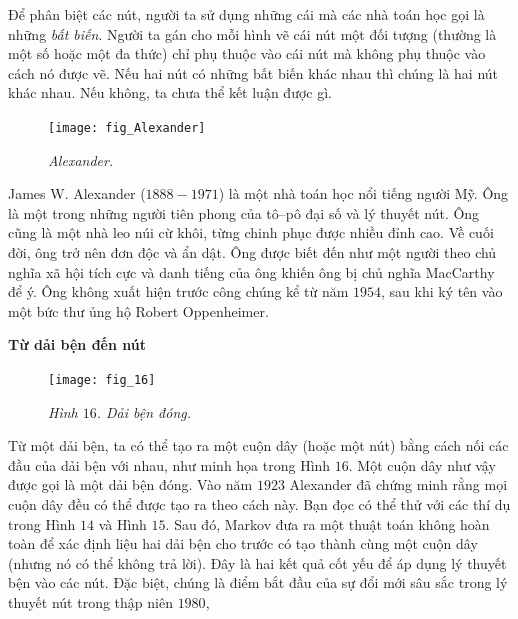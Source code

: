 \begin{multicols}{2}
	\vskip 0.05cm
	Để phân biệt các nút, người ta sử dụng những cái mà các nhà toán học gọi là những \textit{bất biến}. Người ta gán cho mỗi hình vẽ cái nút một đối tượng (thường là một số hoặc một đa thức) chỉ phụ thuộc vào cái nút mà không phụ thuộc vào cách nó được vẽ. Nếu hai nút có những bất biến khác nhau thì chúng là hai nút khác nhau. Nếu không, ta chưa thể kết luận được gì.
	\begin{tBox}
				\begin{figure}
							\vspace*{-15pt}
							\centering
							\captionsetup{labelformat= empty, justification=centering}
							\hspace*{2pt}\texttt{[image: fig\_Alexander]}
							\caption{\small\textit{\color{duongvaotoanhoc}Alexander.}}
							\vspace*{-10pt}
						\end{figure}
				James W. Alexander ($1888-1971$) là một nhà toán học nổi tiếng người Mỹ.  Ông là một trong những người tiên phong của tô--pô đại số và lý thuyết nút. 
				Ông cũng là một nhà leo núi cừ khôi,
từng chinh phục được nhiều đỉnh cao. 
				Về cuối đời, ông trở nên đơn độc và ẩn dật. Ông được biết đến như một người theo chủ nghĩa xã hội tích cực và danh tiếng của ông khiến ông bị chủ nghĩa MacCarthy để ý. Ông không xuất hiện trước công chúng kể từ năm $1954$, sau khi ký tên vào một bức thư ủng hộ Robert Oppenheimer.
			\end{tBox}
	\textbf{\color{duongvaotoanhoc}Từ dải bện đến nút}
	\begin{figure}[H]
		\vspace*{-10pt}
		\centering
		\captionsetup{labelformat= empty, justification=centering}
		\texttt{[image: fig\_16]}
		\caption{\small\textit{\color{duongvaotoanhoc}Hình $16$. Dải bện đóng.}}
		\vspace*{-10pt}
	\end{figure}
	Từ một dải bện, ta có thể tạo ra một cuộn dây (hoặc một nút) bằng cách nối các đầu của dải bện với nhau, như minh họa trong Hình $16$. Một cuộn dây như vậy được gọi là một dải bện đóng. Vào năm $1923$ Alexander đã chứng minh rằng mọi cuộn dây đều có thể được tạo ra theo cách này. Bạn đọc có thể thử với các thí dụ trong Hình $14$ và Hình $15$. Sau đó, Markov đưa ra một thuật toán không hoàn toàn để xác định liệu hai dải bện cho trước có tạo thành cùng một cuộn dây (nhưng nó có thể không trả lời). Đây là hai kết quả cốt yếu để áp dụng lý thuyết bện vào các nút. Đặc biệt, chúng là điểm bắt đầu của sự đổi mới sâu sắc trong lý thuyết nút trong thập niên $1980$,

\end{multicols}
